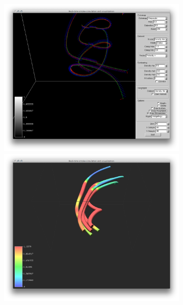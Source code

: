 \begin{figure}[htbp]
\centering
\begin{minipage}[t]{0.48\textwidth}
        \includegraphics[height=3in]{figures/streamtubes/uvp.png}
\caption{}
\label{fig:}
\end{minipage}\hspace{.04\textwidth}%
\begin{minipage}[t]{0.48\textwidth}
               \includegraphics[height=3in]{figures/streamtubes/11thickTubes.png} 
    \caption{}
    \label{fig:}
\end{minipage}
\end{figure}



